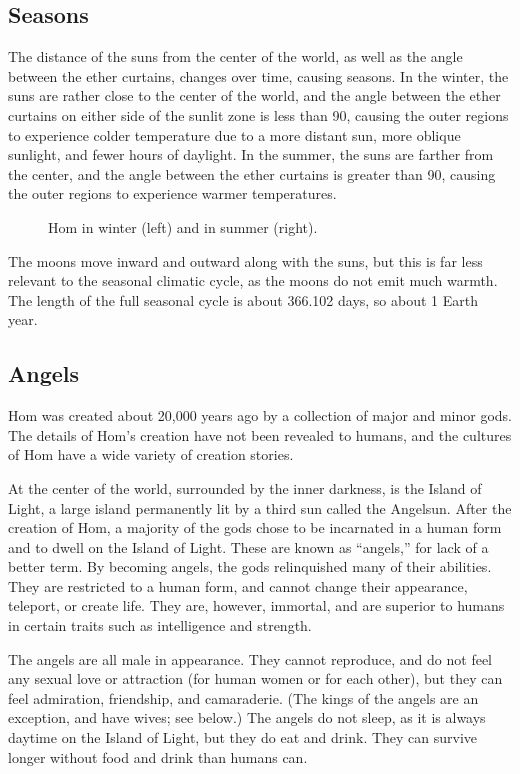 \documentclass{article}
\begin{document}
\subsection{Seasons}

The distance of the suns from the center of the world, as well as the angle between the ether curtains, changes over time, causing seasons. In the winter, the suns are rather close to the center of the world, and the angle between the ether curtains on either side of the sunlit zone is less than 90\degree, causing the outer regions to experience colder temperature due to a more distant sun, more oblique sunlight, and fewer hours of daylight. In the summer, the suns are farther from the center, and the angle between the ether curtains is greater than 90\degree, causing the outer regions to experience warmer temperatures.

\begin{figure}[h]
  \centering
  
  \quad
  
  \caption{Hom in winter (left) and in summer (right).}
\end{figure}

The moons move inward and outward along with the suns, but this is far less relevant to the seasonal climatic cycle, as the moons do not emit much warmth. The length of the full seasonal cycle is about 366.102 days, so about 1 Earth year.

\subsection{Angels}

Hom was created about 20,000 years ago by a collection of major and minor gods. The details of Hom's creation have not been revealed to humans, and the cultures of Hom have a wide variety of creation stories.

At the center of the world, surrounded by the inner darkness, is the Island of Light, a large island permanently lit by a third sun called the Angelsun. After the creation of Hom, a majority of the gods chose to be incarnated in a human form and to dwell on the Island of Light. These are known as ``angels,'' for lack of a better term. By becoming angels, the gods relinquished many of their abilities. They are restricted to a human form, and cannot change their appearance, teleport, or create life. They are, however, immortal, and are superior to humans in certain traits such as intelligence and strength.

The angels are all male in appearance. They cannot reproduce, and do not feel any sexual love or attraction (for human women or for each other), but they can feel admiration, friendship, and camaraderie. (The kings of the angels are an exception, and have wives; see below.) The angels do not sleep, as it is always daytime on the Island of Light, but they do eat and drink. They can survive longer without food and drink than humans can.
\end{document}
